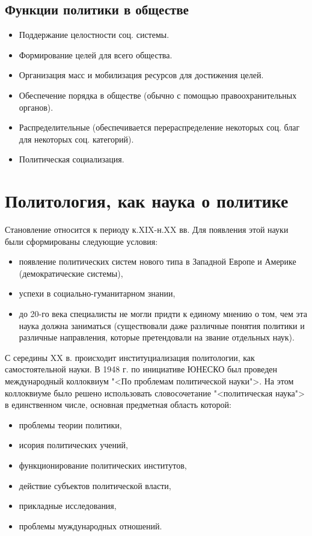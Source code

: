 \subsection{Функции политики в обществе}
\begin{itemize}
	\item Поддержание целостности соц. системы.
	\item Формирование целей для всего общества.
	\item Организация масс и мобилизация ресурсов для достижения целей.
	\item Обеспечение порядка в обществе (обычно с помощью правоохранительных органов).
	\item Распределительные (обеспечивается перераспределение некоторых соц. благ для некоторых соц. категорий).
	\item Политическая социализация.
\end{itemize}

\section{Политология, как наука о политике}
Становление относится к периоду к.XIX-н.XX вв. Для появления этой науки были сформированы следующие условия:
\begin{itemize}
	\item появление политических систем нового типа в Западной Европе и Америке (демократические системы),
	\item успехи в социально-гуманитарном знании,
	\item до 20-го века специалисты не могли придти к единому мнению о том, чем эта наука должна заниматься (существовали даже различные понятия политики и различные направления, которые претендовали на звание отдельных наук).
\end{itemize}

С середины XX в. происходит институциализация политологии, как самостоятельной науки. В 1948 г. по инициативе ЮНЕСКО был проведен международный коллоквиум "<По проблемам политической науки">. На этом коллоквиуме было решено использовать словосочетание "<политическая наука"> в единственном числе, основная предметная область которой:
\begin{itemize}
	\item проблемы теории политики,
	\item исория политических учений,
	\item функционирование политических институтов,
	\item действие субъектов политической власти,
	\item прикладные исследования,
	\item проблемы муждународных отношений.
\end{itemize}

